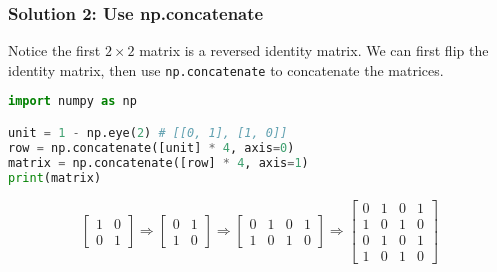 \documentclass[beamer, en, version=2.0]{huangfusl-template}
\begin{document}
    \begin{frame}[fragile]
        \frametitle{Solution 2: Use {\normalsize\ttfamily np.concatenate}}

        Notice the first $2\times 2$ matrix is a reversed identity matrix. We can first flip the identity matrix, then use {\color{blue}\footnotesize\verb|np.concatenate|} to concatenate the matrices.

\begin{lstlisting}[language=python]
import numpy as np

unit = 1 - np.eye(2) # [[0, 1], [1, 0]]
row = np.concatenate([unit] * 4, axis=0)
matrix = np.concatenate([row] * 4, axis=1)
print(matrix)
\end{lstlisting}
        \begin{equation*}
            \begin{bmatrix}
                1 & 0 \\
                0 & 1
            \end{bmatrix} \Longrightarrow \begin{bmatrix}
                0 & 1 \\
                1 & 0
            \end{bmatrix} \Longrightarrow \begin{bmatrix}
                0 & 1 & 0 & 1 \\
                1 & 0 & 1 & 0
            \end{bmatrix} \Longrightarrow \begin{bmatrix}
                0 & 1 & 0 & 1 \\
                1 & 0 & 1 & 0 \\
                0 & 1 & 0 & 1 \\
                1 & 0 & 1 & 0
            \end{bmatrix}
        \end{equation*}
    \end{frame}
\end{document}

